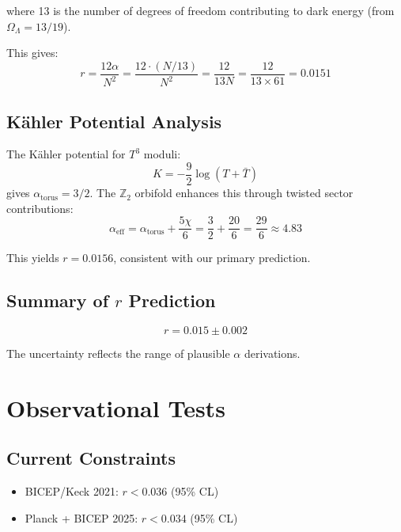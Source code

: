 \documentclass[12pt,a4paper]{article}
\begin{document}
where 13 is the number of degrees of freedom contributing to dark energy (from $\Omega_\Lambda = 13/19$).

This gives:
\begin{equation}
r = \frac{12\alpha}{N^2} = \frac{12 \cdot (N/13)}{N^2} = \frac{12}{13N} = \frac{12}{13 \times 61} = 0.0151
\end{equation}

\subsection{K\"ahler Potential Analysis}

The K\"ahler potential for $T^3$ moduli:
\begin{equation}
K = -\frac{9}{2} \log(T + \bar{T})
\end{equation}
gives $\alpha_{\text{torus}} = 3/2$. The $\mathbb{Z}_2$ orbifold enhances this through twisted sector contributions:
\begin{equation}
\alpha_{\text{eff}} = \alpha_{\text{torus}} + \frac{5\chi}{6} = \frac{3}{2} + \frac{20}{6} = \frac{29}{6} \approx 4.83
\end{equation}

This yields $r = 0.0156$, consistent with our primary prediction.

\subsection{Summary of $r$ Prediction}

\begin{equation}
\boxed{r = 0.015 \pm 0.002}
\end{equation}

The uncertainty reflects the range of plausible $\alpha$ derivations.

\section{Observational Tests}

\subsection{Current Constraints}

\begin{itemize}
    \item BICEP/Keck 2021: $r < 0.036$ (95\% CL)
    \item Planck + BICEP 2025: $r < 0.034$ (95\% CL)
\end{itemize}
\end{document}
